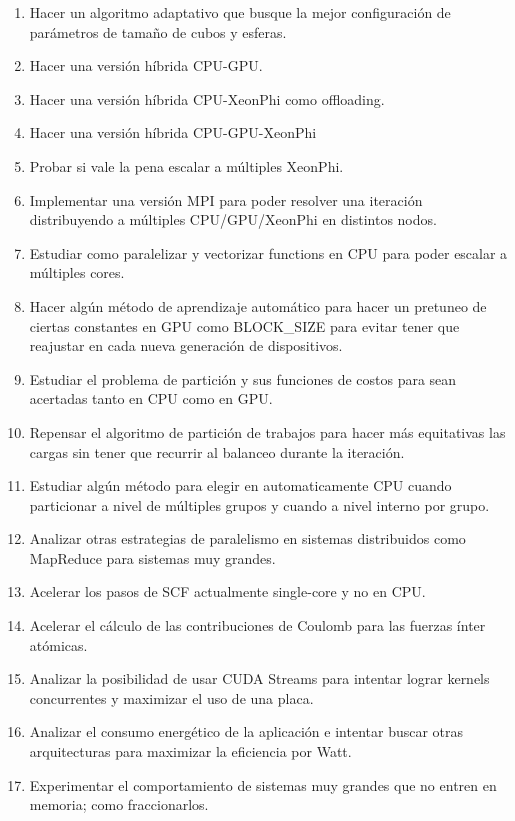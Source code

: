 \begin{enumerate}
  \item Hacer un algoritmo adaptativo que busque la mejor configuraci\'on de par\'ametros de tama\~no de cubos y esferas.
  \item Hacer una versi\'on h\'ibrida CPU-GPU.
  \item Hacer una versi\'on h\'ibrida CPU-XeonPhi como offloading.
  \item Hacer una versi\'on h\'ibrida CPU-GPU-XeonPhi
  \item Probar si vale la pena escalar a m\'ultiples XeonPhi.
  \item Implementar una versi\'on MPI para poder resolver una iteraci\'on distribuyendo
    a m\'ultiples CPU/GPU/XeonPhi en distintos nodos.
  \item Estudiar como paralelizar y vectorizar functions en CPU para poder escalar a m\'ultiples cores.
  \item Hacer alg\'un m\'etodo de aprendizaje autom\'atico para hacer un pretuneo de ciertas constantes en GPU como
    BLOCK\_SIZE para evitar tener que reajustar en cada nueva generaci\'on de dispositivos.
  \item Estudiar el problema de partici\'on y sus funciones de costos para sean acertadas tanto en CPU
    como en GPU.
  \item Repensar el algoritmo de partici\'on de trabajos para hacer m\'as equitativas las cargas sin
    tener que recurrir al balanceo durante la iteraci\'on.
  \item Estudiar alg\'un m\'etodo para elegir en automaticamente CPU cuando particionar a nivel
    de m\'ultiples grupos y cuando a nivel interno por grupo.
  \item Analizar otras estrategias de paralelismo en sistemas distribuidos como MapReduce para sistemas muy grandes.
  \item Acelerar los pasos de SCF actualmente single-core y no en CPU.
  \item Acelerar el c\'alculo de las contribuciones de Coulomb para las fuerzas \'inter at\'omicas.
  \item Analizar la posibilidad de usar CUDA Streams para intentar lograr kernels concurrentes y maximizar
    el uso de una placa.
  \item Analizar el consumo energ\'etico de la aplicaci\'on e intentar buscar otras arquitecturas para maximizar
    la eficiencia por Watt.
  \item Experimentar el comportamiento de sistemas muy grandes que no entren en memoria; como fraccionarlos.

\end{enumerate}
